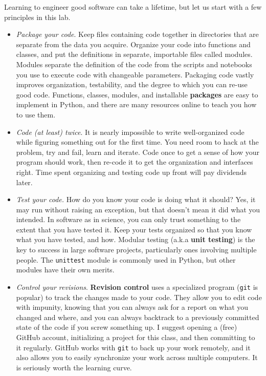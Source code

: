 \documentclass[12pt,preprint]{aastex}
\begin{document}
Learning to engineer good software can take a lifetime, but let us start with a few
principles in this lab.

\begin{itemize}

\item {\it Package your code}.  Keep files containing code together in 
directories that are separate from the data you acquire.  
Organize your code into functions and classes, and put the definitions in separate, importable files called modules.  
Modules separate the definition
of the code from the scripts and notebooks you use to execute code with changeable parameters. Packaging code vastly improves
organization, testability, and the degree to which you can re-use good code. Functions, classes, modules, and installable {\bf packages}
are easy to implement in Python, and there are many resources online to teach you how to use them. 

\item {\it Code (at least) twice}. It is nearly impossible to write well-organized code while figuring
something out for the first time. You need room to hack at the problem, try and fail, learn and iterate.
Code once to get a sense of how your program should work, then
re-code it to get the organization and interfaces right. Time spent organizing and testing code up front will pay
dividends later.

\item {\it Test your code.} How do you know your code is doing what it should? Yes, it may run
without raising an exception, but that doesn't mean it did what you intended. In software as in science,
you can only trust something to the extent that you have tested it.
Keep your tests organized so that you know what you have tested, and how. Modular testing (a.k.a 
{\bf unit testing}) is the key to success in large
software projects, particularly ones involving multiple people. The {\tt unittest} module is 
commonly used in Python, but other modules have their own merits.

\item{\it Control your revisions}.  {\bf Revision control} uses a specialized program ({\tt git} is popular) to
track the changes made to your code. They allow you to edit code with impunity, knowing that you can
always ask for a report on what you changed and where, and you can always backtrack to a previously committed
state of the code if you screw something up.
I suggest opening a (free) GitHub account, initializing a project
for this class, and then committing to it regularly.  GitHub works with {\tt git} to back up your work remotely, and it also 
allows you to easily synchronize your work across multiple computers.  It is seriously worth the learning curve.

\end{itemize}
\end{document}
